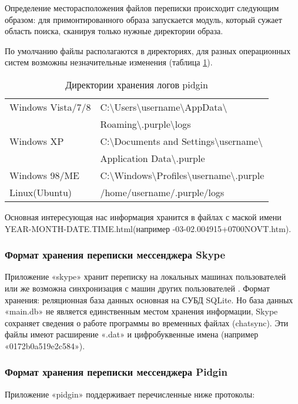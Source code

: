 Определение месторасположения файлов переписки происходит следующим образом: для примонтированного образа запускается модуль, который сужает область поиска, сканируя только нужные директории образа. 

По умолчанию файлы располагаются в директориях, для разных операционных систем возможны незначительные изменения (таблица \ref{tab:pidgin}). 

\begin{table}[h!]
\caption{Директории хранения логов pidgin}
\label{tab:pidgin}
\begin{tabularx}{\linewidth}{|l|X|}
\hline
Windows Vista/7/8 & C:\textbackslash Users\textbackslash username\textbackslash  AppData\textbackslash \tabularnewline &  Roaming\textbackslash .purple\textbackslash  logs \tabularnewline 
\hline 
Windows XP & C:\textbackslash  Documents and Settings\textbackslash  username\textbackslash \tabularnewline & Application Data\textbackslash .purple\tabularnewline
\hline 
Windows 98/ME 	& C:\textbackslash Windows\textbackslash Profiles\textbackslash username\textbackslash.purple \tabularnewline
\hline 
Linux(Ubuntu) &	/home/username/.purple/logs \tabularnewline 
\hline
\end{tabularx}
\end{table}

Основная интересующая нас информация хранится в файлах с маской имени \ttfamily YEAR-MONTH-DATE.TIME.html\normalfont (например -03-02.004915+0700NOVT.htm\normalfont).

\subsubsection{Формат хранения переписки мессенджера Skype}

Приложение «skype» хранит переписку на локальных машинах пользователей или же возможна синхронизация с машин других пользователей \cite{skypechat}. Формат хранения: реляционная база данных основная на СУБД SQLite.
Но база данных «main.db» не является единственным местом хранения информации, Skype сохраняет сведения о работе программы во временных файлах (chatsync). Эти файлы имеют расширение «.dat» и цифробуквенные имена (например «0172b0a519e2c584»)\cite{cfl}.

\subsubsection{Формат хранения переписки мессенджера Pidgin}
Приложение «pidgin» поддерживает перечисленные ниже протоколы: \cite{ofpidgin}

